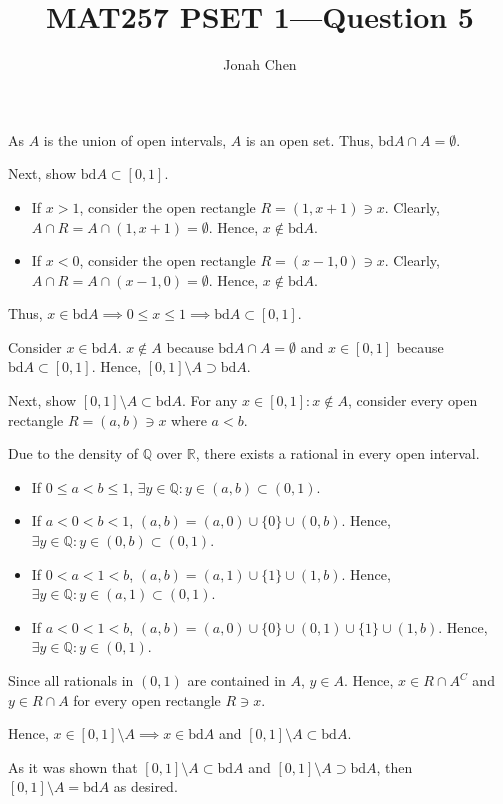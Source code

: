 \documentclass[a4paper]{article}
\title{MAT257 PSET 1---Question 5}
\author{Jonah Chen}
\numberwithin{equation}{section}
\newcommand{\R}{\mathbb{R}}
\newcommand{\bd}{\mathrm{bd }}
\begin{document}
\sffamily
As $A$ is the union of open intervals, $A$ is an open set. Thus, $\bd A\cap A=\emptyset$.

Next, show $\bd A\subset[0,1]$.
\begin{itemize}
    \item If $x>1$, consider the open rectangle $R=(1,x+1)\ni x$. Clearly, $A\cap R=A\cap (1,x+1)=\emptyset$. Hence, $x\notin\bd A$. 
    \item If $x<0$, consider the open rectangle $R=(x-1,0)\ni x$. Clearly, $A\cap R=A\cap (x-1,0)=\emptyset$. Hence, $x\notin\bd A$. 
\end{itemize}
Thus, $x\in\bd A\implies 0\leq x\leq 1\implies\bd A\subset[0,1]$. 

Consider $x\in \bd A$. $x\notin A$ because $\bd A\cap A=\emptyset$ and $x\in[0,1]$ because $\bd A\subset[0,1]$. Hence, $[0,1]\setminus A\supset\bd A$.

Next, show $[0,1]\setminus A\subset\bd A$. For any $x\in[0,1]:x\notin A$, consider every open rectangle $R=(a,b)\ni x$ where $a<b$.

Due to the density of $\mathbb Q$ over $\R$, there exists a rational in every open interval. 
\begin{itemize}
    \item If $0\leq a<b\leq 1$, $\exists y\in\mathbb Q:y\in(a,b)\subset(0,1)$.
    \item If $a<0<b<1$, $(a,b)=(a,0)\cup\{0\}\cup(0,b)$. Hence, $\exists y\in\mathbb Q:y\in(0,b)\subset(0,1)$.
    \item If $0<a<1<b$, $(a,b)=(a,1)\cup\{1\}\cup(1,b)$. Hence, $\exists y\in\mathbb Q:y\in(a,1)\subset(0,1)$.
    \item If $a<0<1<b$, $(a,b)=(a,0)\cup\{0\}\cup(0,1)\cup\{1\}\cup(1,b)$. Hence, $\exists y\in\mathbb Q:y\in(0,1)$.
\end{itemize}
Since all rationals in $(0,1)$ are contained in $A$, $y\in A$. Hence, $x\in R\cap A^C$ and $y\in R\cap A$ for every open rectangle $R\ni x$. 

Hence, $x\in [0,1]\setminus A\implies x\in\bd A$ and $[0,1]\setminus A\subset \bd A$.

As it was shown that $[0,1]\setminus A\subset\bd A$ and $[0,1]\setminus A\supset\bd A$, then $[0,1]\setminus A=\bd A$ as desired.
\end{document}
